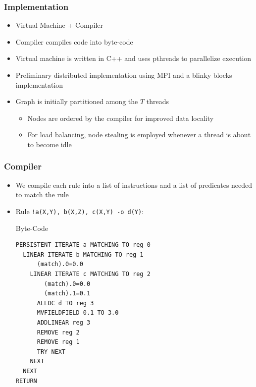 \documentclass{beamer}
\begin{document}
\begin{frame}[fragile]
   \frametitle{Implementation}
   \begin{itemize}
      \item Virtual Machine + Compiler
      \item Compiler compiles code into byte-code
      \item Virtual machine is written in C++ and uses pthreads to parallelize execution
      \item Preliminary distributed implementation using MPI and a blinky blocks implementation
      \item Graph is initially partitioned among the $T$ threads
      \begin{itemize}
         \item Nodes are ordered by the compiler for improved data locality
         \item For load balancing, node stealing is employed whenever a thread is about to become idle
      \end{itemize}
   \end{itemize}
\end{frame}

\begin{frame}[fragile]
   \frametitle{Compiler}
   \begin{itemize}
      \item We compile each rule into a list of instructions and a list of predicates needed to match the rule
      \item Rule \texttt{!a(X,Y), b(X,Z), c(X,Y) -o d(Y)}:
      \begin{block}{Byte-Code}
         \scriptsize\begin{verbatim}
PERSISTENT ITERATE a MATCHING TO reg 0
  LINEAR ITERATE b MATCHING TO reg 1
      (match).0=0.0
    LINEAR ITERATE c MATCHING TO reg 2
        (match).0=0.0
        (match).1=0.1
      ALLOC d TO reg 3
      MVFIELDFIELD 0.1 TO 3.0
      ADDLINEAR reg 3
      REMOVE reg 2
      REMOVE reg 1
      TRY NEXT
    NEXT
  NEXT
RETURN
         \end{verbatim}
      \end{block}
   \end{itemize}
\end{frame}
\end{document}
